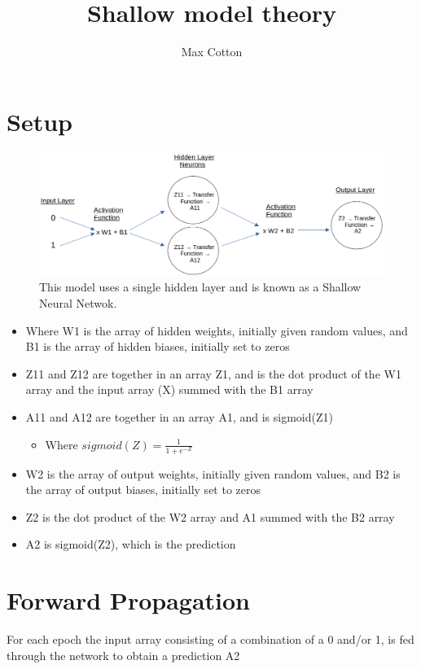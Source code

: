 \documentclass[10pt,a4paper]{article}
\title{Shallow model theory}
\author{Max Cotton}
\date{}
\begin{document}
\maketitle

\section{Setup}

\begin{figure}[h!]
\centering
\includegraphics[width=1\textwidth]{src/utils/images/shallow-ann-diagram.png}
\caption{This model uses a single hidden layer and is known as a Shallow Neural Netwok.}
\end{figure}

\begin{itemize}
    \item Where W1 is the array of hidden weights, initially given random values, and B1 is the array of hidden biases, initially set to zeros
    \item Z11 and Z12 are together in an array Z1, and is the dot product of the W1 array and the input array (X) summed with the B1 array
    \item A11 and A12 are together in an array A1, and is sigmoid(Z1)
    \begin{itemize}
        \item Where $sigmoid(Z) = \frac{1}{1+e^{-Z}}$
    \end{itemize}
    \item W2 is the array of output weights, initially given random values, and B2 is the array of output biases, initially set to zeros
    \item Z2 is the dot product of the W2 array and A1 summed with the B2 array
    \item A2 is sigmoid(Z2), which is the prediction
\end{itemize}

\section{Forward Propagation}
For each epoch the input array consisting of a combination of a 0 and/or 1, is fed through the network to obtain a prediction A2
\end{document}
